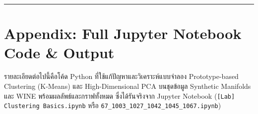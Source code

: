 \documentclass[12pt,a4paper]{article}
\begin{document}
\vspace{0.8em}
\hrule
\vspace{0.8em}

\clearpage
\appendix
\raggedbottom
\section*{Appendix: Full Jupyter Notebook Code \& Output}

รายละเอียดต่อไปนี้คือโค้ด Python ที่ใช้แก้ปัญหาและวิเคราะห์แบบจำลอง Prototype-based Clustering (K-Means) และ High-Dimensional PCA บนชุดข้อมูล Synthetic Manifolds และ WINE พร้อมผลลัพธ์และกราฟทั้งหมด ซึ่งได้รันจริงจาก Jupyter Notebook (\texttt{[Lab] Clustering Basics.ipynb} หรือ \texttt{67\_1003\_1027\_1042\_1045\_1067.ipynb})


\end{document}
